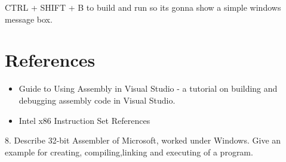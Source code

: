 \documentclass[12pt]{extarticle}
\begin{document}
 CTRL + SHIFT + B to build and run so its gonna show a simple windows message box.


 









\section{References}

\begin{itemize}
    \item Guide to Using Assembly in Visual Studio - a tutorial on building and debugging assembly code in Visual Studio.
    \item Intel x86 Instruction Set References
\end{itemize}
8. Describe 32-bit Assembler of Microsoft, worked under Windows. Give an example for creating, compiling,linking and executing of a program.
\end{document}
